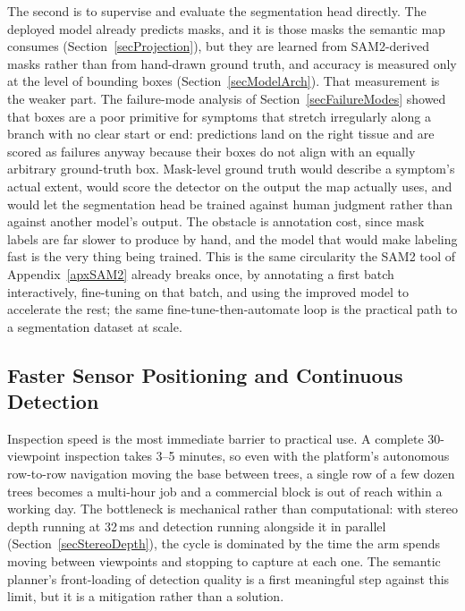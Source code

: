The second is to supervise and evaluate the segmentation head directly.
The deployed model already predicts masks, and it is those masks the
semantic map consumes (Section~\ref{secProjection}), but they are learned
from SAM2-derived masks rather than from hand-drawn ground truth, and
accuracy is measured only at the level of bounding boxes
(Section~\ref{secModelArch}).
That measurement is the weaker part.
The failure-mode analysis of Section~\ref{secFailureModes} showed that
boxes are a poor primitive for symptoms that stretch irregularly along a
branch with no clear start or end: predictions land on the right tissue
and are scored as failures anyway because their boxes do not align with an
equally arbitrary ground-truth box.
Mask-level ground truth would describe a symptom's actual extent, would
score the detector on the output the map actually uses, and would let the
segmentation head be trained against human judgment rather than against
another model's output.
The obstacle is annotation cost, since mask labels are far slower
to produce by hand, and the model that would make labeling fast is the
very thing being trained.
This is the same circularity the SAM2 tool of Appendix~\ref{apxSAM2}
already breaks once, by annotating a first batch interactively,
fine-tuning on that batch, and using the improved model to accelerate the
rest; the same fine-tune-then-automate loop is the practical path to a
segmentation dataset at scale.

\subsection{Faster Sensor Positioning and Continuous Detection}
\label{secFutureManipulation}

Inspection speed is the most immediate barrier to practical use.
A complete 30-viewpoint inspection takes 3--5 minutes, so even with the
platform's autonomous row-to-row navigation moving the base between trees,
a single row of a few dozen trees becomes a multi-hour job and a
commercial block is out of reach within a working day.
The bottleneck is mechanical rather than computational: with stereo depth
running at 32\,ms and detection running alongside it in parallel
(Section~\ref{secStereoDepth}), the cycle is dominated by the time the arm
spends moving between viewpoints and stopping to capture at each one.
The semantic planner's front-loading of detection quality is a first
meaningful step against this limit, but it is a mitigation rather than a
solution.

